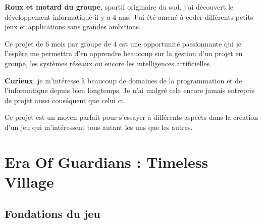 \documentclass[12pt]{article}
\begin{document}
            \begin{tcolorbox} [
                coltitle=black, 
                colframe=orange!50!white,
                colback=orange!5,
                title= \subsubsection{Erwann "R-One" Lesech (Responsable Réseau)}
            ]
                \setlength{\parindent}{3ex} \textbf{Roux et motard du groupe}, sportif originaire du sud, j'ai découvert le développement informatique il y a 4 ans. J'ai été amené à coder différents petits jeux et applications sans grandes ambitions. 
                \\
                \par Ce projet de 6 mois par groupe de 4 est une opportunité passionnante qui je l'espère me permettra d'en apprendre beaucoup sur la gestion d'un projet en groupe, les systèmes réseaux ou encore les intelligences artificielles.
            \end{tcolorbox}
            
            \begin{tcolorbox} [
                coltitle=black, 
                colframe=purple!40!white, 
                colback=purple!10, 
                title= \subsubsection{Guillaume "Guimauve" Jolivalt (Responsable Modélisation)}
            ]
                \setlength{\parindent}{3ex} \textbf{Curieux}, je m'intéresse à beaucoup de domaines de la programmation et de l'informatique depuis bien longtemps. Je n'ai malgré cela encore jamais entrepris de projet aussi conséquent que celui ci. 
                \\
                \par Ce projet est un moyen parfait pour s'essayer à différents aspects dans la création d'un jeu qui m'intéressent tous autant les uns que les autres.
            \end{tcolorbox}

    \section{Era Of Guardians : Timeless Village}
        \subsection{Fondations du jeu}
\end{document}
